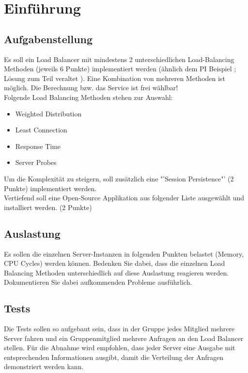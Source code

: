\documentclass[letterpaper, 12pt]{article}
\let\tempsection\section
\renewcommand\section[1]{\vspace{-0.3cm}\tempsection{#1}\vspace{-0.3cm}}
\let\tempsubsection\subsection
\renewcommand\subsection[1]{\vspace{0cm}\tempsubsection{#1}\vspace{0cm}}
\begin{document}
\parindent 0pt
\parskip 6pt



\clearpage
\thispagestyle{empty}
\tableofcontents

\newpage
{}
\pagestyle{fancy}

\section{Einführung}
\label{sec:Einführung}
\subsection{Aufgabenstellung}
\label{sec:Aufgabenstellung}
Es soll ein Load Balancer mit mindestens 2 unterschiedlichen Load-Balancing Methoden (jeweils 6 Punkte) implementiert werden (ähnlich dem PI Beispiel \cite{Angabe1}; Lösung zum Teil veraltet \cite{Angabe2}). Eine Kombination von mehreren Methoden ist möglich. Die Berechnung bzw. das Service ist frei wählbar! \\
Folgende Load Balancing Methoden stehen zur Auswahl:
\begin{itemize}
	\item Weighted Distribution
	\item Least Connection
	\item Response Time
	\item Server Probes
\end{itemize}
Um die Komplexität zu steigern, soll zusätzlich eine "'Session Persistence"' (2 Punkte) implementiert werden. \\
Vertiefend soll eine Open-Source Applikation aus folgender Liste ausgewählt und installiert werden. (2 Punkte)\cite{Angabe3}

\subsection{Auslastung}
\label{sec:Auslastung}
Es sollen die einzelnen Server-Instanzen in folgenden Punkten belastet (Memory, CPU Cycles) werden können.
Bedenken Sie dabei, dass die einzelnen Load Balancing Methoden unterschiedlich auf diese Auslastung reagieren werden. Dokumentieren Sie dabei aufkommenden Probleme ausführlich.

\subsection{Tests}
\label{sec:Tests}
Die Tests sollen so aufgebaut sein, dass in der Gruppe jedes Mitglied mehrere Server fahren und ein Gruppenmitglied mehrere Anfragen an den Load Balancer stellen. Für die Abnahme wird empfohlen, dass jeder Server eine Ausgabe mit entsprechenden Informationen ausgibt, damit die Verteilung der Anfragen demonstriert werden kann.
\end{document}
